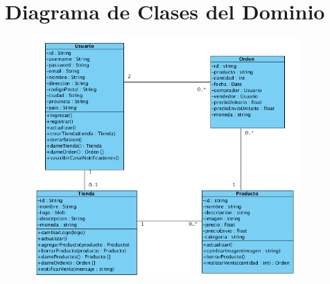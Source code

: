 \section{Diagrama de Clases del Dominio}

\begin{figure}[H]
  \centering
    \includegraphics[width=0.9\textwidth]{imagenes/analisis/clases-dominio.png}
    \label{fig:clases-dominio}
\end{figure}